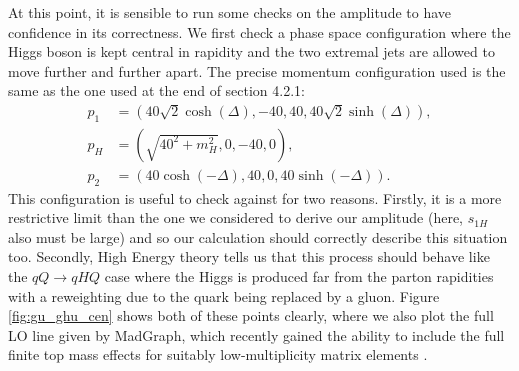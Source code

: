 At this point, it is sensible to run some checks on the amplitude to have confidence in its correctness. We first check a phase space configuration where the Higgs boson is kept central in rapidity and the two extremal jets are allowed to move further and further apart. The precise momentum configuration used is the same as the one used at the end of section 4.2.1:
\begin{subequations}
\begin{align}
p_1 &= (40 \sqrt{2} \cosh(\Delta),-40,40,40 \sqrt{2} \sinh(\Delta)), \\
p_H &= (\sqrt{40^2+m_H^2}, 0,-40,0), \\
p_2 &= (40 \cosh(-\Delta),40,0,40 \sinh(-\Delta)).
\end{align}
\end{subequations}
This configuration is useful to check against for two reasons. Firstly, it is a more restrictive limit than the one we considered to derive our amplitude (here, $s_{1H}$ also must be large) and so our calculation should correctly describe this situation too. Secondly, High Energy theory tells us that this process should behave like the $qQ \to qHQ$ case where the Higgs is produced far from the parton rapidities with a reweighting due to the quark being replaced by a gluon. Figure \ref{fig:gu_ghu_cen} shows both of these points clearly, where we also plot the full LO line given by MadGraph, which recently gained the ability to include the full finite top mass effects for suitably low-multiplicity matrix elements \cite{Alwall2007}. 

